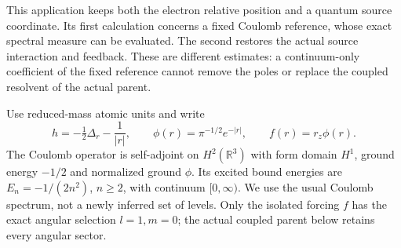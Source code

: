 \documentclass[11pt]{article}
\numberwithin{equation}{section}
\theoremstyle{definition}
\theoremstyle{remark}
\begin{document}
This application keeps both the electron relative position and a
quantum source coordinate. Its first calculation concerns a fixed
Coulomb reference, whose exact spectral measure can be evaluated.
The second restores the actual source interaction and feedback.
These are different estimates: a continuum-only coefficient of the
fixed reference cannot remove the poles or replace the coupled
resolvent of the actual parent.

Use reduced-mass atomic units and write
\begin{equation}\label{p4h:eq:electron}
 h=-\tfrac12\Delta_r-\frac1{|r|},\qquad
 \phi(r)=\pi^{-1/2}e^{-|r|},\qquad f(r)=r_z\phi(r).
\end{equation}
The Coulomb operator is self-adjoint on $H^2(\mathbb R^3)$ with
form domain $H^1$, ground energy $-1/2$ and normalized ground
$\phi$. Its excited bound energies are $E_n=-1/(2n^2)$,
$n\geq2$, with continuum $[0,\infty)$.
We use the usual Coulomb spectrum, not a newly inferred set of levels.
Only the isolated forcing $f$ has the exact angular selection
$l=1,m=0$; the actual coupled parent below retains every angular sector.
\end{document}
